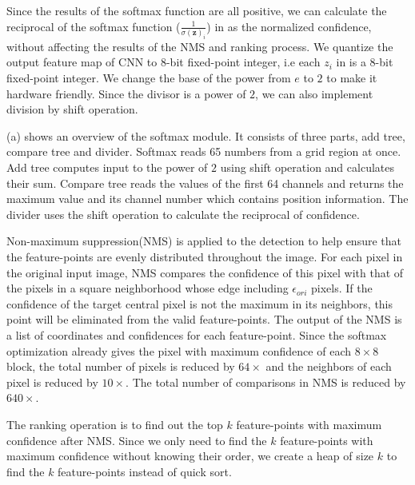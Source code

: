Since the results of the softmax function are all positive, we can calculate the reciprocal of the softmax function ($\frac{1}{\sigma (\mathbf {z} )_{i}}$) in  as the normalized confidence, without affecting the results of the NMS and ranking process. We quantize the output feature map of CNN to 8-bit fixed-point integer, i.e each $z_i$ in  is a 8-bit fixed-point integer. We change the base of the power from $e$ to $2$ to make it hardware friendly. Since the divisor is a power of $2$, we can also implement division by shift operation.

(a) shows an overview of the softmax module. It consists of three parts, add tree, compare tree and divider. Softmax reads 65 numbers from a grid region at once. Add tree computes input to the power of $2$ using shift operation and calculates their sum. Compare tree reads the values of the first 64 channels and returns the maximum value and its channel number which contains position information. The divider uses the shift operation to calculate the reciprocal of confidence.

Non-maximum suppression(NMS) is applied to the detection to help ensure that the feature-points are evenly distributed throughout the image. 
For each pixel in the original input image, NMS compares the confidence of this pixel with that of the pixels in a square neighborhood whose edge including $\epsilon _{ori}$ pixels. 
If the confidence of the target central pixel is not the maximum in its neighbors, this point will be eliminated from the valid feature-points. 
The output of the NMS is a list of coordinates and confidences for each feature-point. 
Since the softmax optimization already gives the pixel with maximum confidence of each $8 \times 8$ block, the total number of pixels is reduced by $64 \times$ and the neighbors of each pixel is reduced by $10 \times$.
The total number of comparisons in NMS is reduced by $640\times$.

The ranking operation is to find out the top $k$ feature-points with maximum confidence after NMS. 
Since we only need to find the $k$ feature-points with maximum  confidence without knowing their order, we create a heap of size $k$ to find the $k$ feature-points instead of quick sort.




